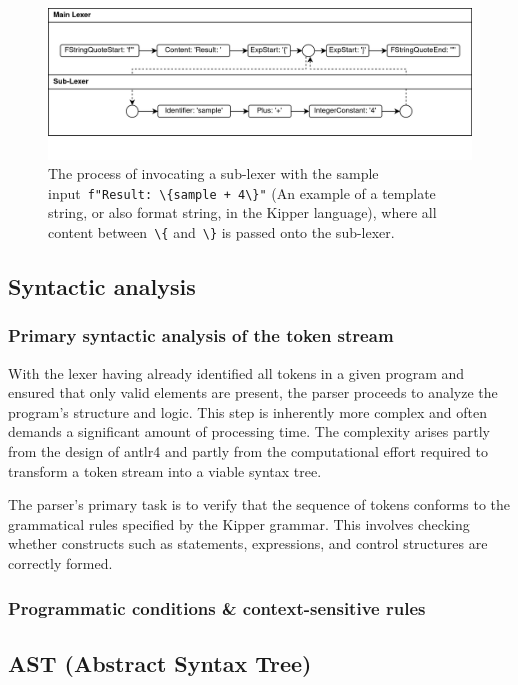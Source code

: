 \begin{figure}[h!]
	\centering
	\def\stackalignment{r}
	\includegraphics[scale=0.8]{./pics/Sub-Lexer.drawio}
	\caption{The process of invocating a sub-lexer with the sample input~\lstinline|f"Result: \{sample + 4\}"| (An example of a template string, or also format string, in the Kipper language), where all content between~\lstinline|\{| and~\lstinline|\}| is passed onto the sub-lexer.}
	\label{fig:implementation:Sub-Lexer}
\end{figure}

\subsection{Syntactic analysis}

\subsubsection{Primary syntactic analysis of the token stream}

With the lexer having already identified all tokens in a given program and ensured that only valid elements are present, the parser proceeds to analyze the program's structure and logic. This step is inherently more complex and often demands a significant amount of processing time. The complexity arises partly from the design of \Gls{antlr4} and partly from the computational effort required to transform a token stream into a viable syntax tree.

The parser's primary task is to verify that the sequence of tokens conforms to the grammatical rules specified by the Kipper grammar. This involves checking whether constructs such as statements, expressions, and control structures are correctly formed.

\subsubsection{Programmatic conditions \& context-sensitive rules}

\subsection{AST (Abstract Syntax Tree)}
\label{sec:translation-to-the-ast}

